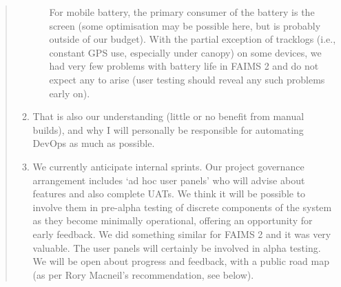 \documentclass[a4paper,headings=small fontsize=10pt]{scrreprt}
\begin{document}
\begin{quote}
\begin{enumerate}[itemsep=1em]
\begin{enumerate}
    For mobile battery, the primary consumer of the battery 
    is the screen (some optimisation may be possible here, but is probably outside
    of our budget). With the partial exception of tracklogs (i.e., constant GPS use, 
    especially under canopy) on some devices, we had very few problems with battery 
    life in FAIMS 2 and do not expect any to arise (user testing should reveal any such
    problems early on). 
   
  \end{enumerate}
\item That is also our understanding (little or no benefit from manual builds), 
   and why I will personally be responsible for automating DevOps as much as possible.
 
\item We currently anticipate internal sprints. Our project governance arrangement
   includes `ad hoc user panels' who will advise about features and also complete UATs.
   We think it will be possible to involve them in pre-alpha testing of discrete 
   components of the system as they become minimally operational, offering an
   opportunity for early feedback. We did something similar for FAIMS 2 and it was
   very valuable. The user panels will certainly be involved in alpha testing.
   We will be open about progress and feedback, with a public road map (as per Rory 
   Macneil's recommendation, see below). 
 

\end{enumerate}
\end{quote}
\end{document}
